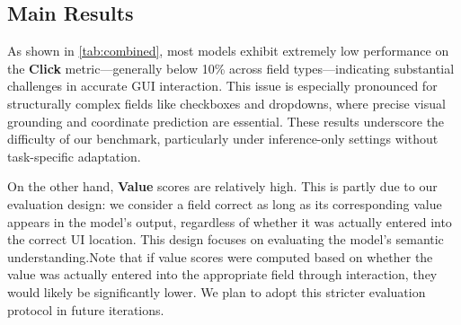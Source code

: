\documentclass[sigconf, screen, review]{acmart}
\newcommand{\bobo}[1]{%
  \begin{CJK}{UTF8}{gbsn} %
  {\color{cyan}Bobo: #1}%
  \end{CJK}%
}
\begin{document}



\subsection{Main Results}

As shown in \cref{tab:combined}, most models exhibit extremely low performance on the \textbf{Click} metric—generally below 10\% across field types—indicating substantial challenges in accurate GUI interaction.
This issue is especially pronounced for structurally complex fields like checkboxes and dropdowns, where precise visual grounding and coordinate prediction are essential.
These results underscore the difficulty of our benchmark, particularly under inference-only settings without task-specific adaptation.

On the other hand, \textbf{Value} scores are relatively high.
This is partly due to our evaluation design: we consider a field correct as long as its corresponding value appears in the model’s output, regardless of whether it was actually entered into the correct UI location.
This design focuses on evaluating the model’s semantic understanding.Note that if value scores were computed based on whether the value was actually entered into the appropriate field through interaction, they would likely be significantly lower. We plan to adopt this stricter evaluation protocol in future iterations.

\end{document}
